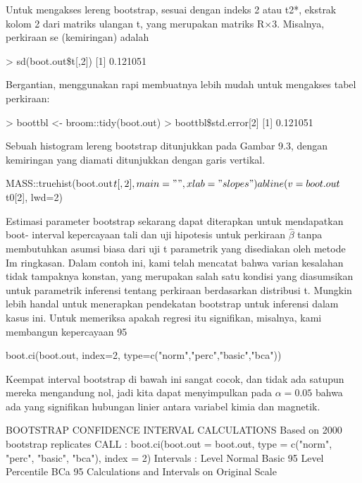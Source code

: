 \documentclass[a4paper,12pt]{article}
\theoremstyle{definition}
\begin{document}
Untuk mengakses lereng bootstrap, sesuai dengan indeks 2 atau t2*, ekstrak kolom 2 dari matriks ulangan t, yang merupakan matriks R×3. Misalnya, perkiraan se (kemiringan) adalah
\begin{spverbatim}
> sd(boot.out\$t[,2])
[1] 0.121051
\end{spverbatim}
Bergantian, menggunakan rapi membuatnya lebih mudah untuk mengakses tabel perkiraan:
\begin{spverbatim}
> boottbl <- broom::tidy(boot.out)
> boottbl\$std.error[2]
[1] 0.121051
\end{spverbatim}
Sebuah histogram lereng bootstrap ditunjukkan pada Gambar 9.3, dengan kemiringan yang diamati ditunjukkan dengan garis vertikal.
\begin{spverbatim}
MASS::truehist(boot.out$t[ ,2], main="", xlab="slopes")
abline(v = boot.out$t0[2], lwd=2)
\end{spverbatim}
Estimasi parameter bootstrap sekarang dapat diterapkan untuk mendapatkan boot- interval kepercayaan tali dan uji hipotesis untuk perkiraan $\widehat{\beta}$ tanpa membutuhkan asumsi biasa dari uji t parametrik yang disediakan oleh metode Im ringkasan.
Dalam contoh ini, kami telah mencatat bahwa varian kesalahan tidak tampaknya konstan, yang merupakan salah satu kondisi yang diasumsikan untuk parametrik inferensi tentang perkiraan berdasarkan distribusi t. Mungkin lebih handal untuk menerapkan pendekatan bootstrap untuk inferensi dalam kasus ini. Untuk memeriksa apakah regresi itu signifikan, misalnya, kami membangun kepercayaan 95%

\begin{spverbatim}
boot.ci(boot.out, index=2, type=c("norm","perc","basic","bca"))
\end{spverbatim}
Keempat interval bootstrap di bawah ini sangat cocok, dan tidak ada satupun mereka mengandung nol, jadi kita dapat menyimpulkan pada $\alpha=0.05$ bahwa ada yang signifikan
hubungan linier antara variabel kimia dan magnetik.
\begin{spverbatim}
BOOTSTRAP CONFIDENCE INTERVAL CALCULATIONS
Based on 2000 bootstrap replicates
CALL :
boot.ci(boot.out = boot.out, type = c("norm", "perc", "basic",
"bca"), index = 2)
Intervals :
Level     Normal            Basic
95%
Level    Percentile         BCa
95%
Calculations and Intervals on Original Scale
\end{spverbatim}  
\end{document}
